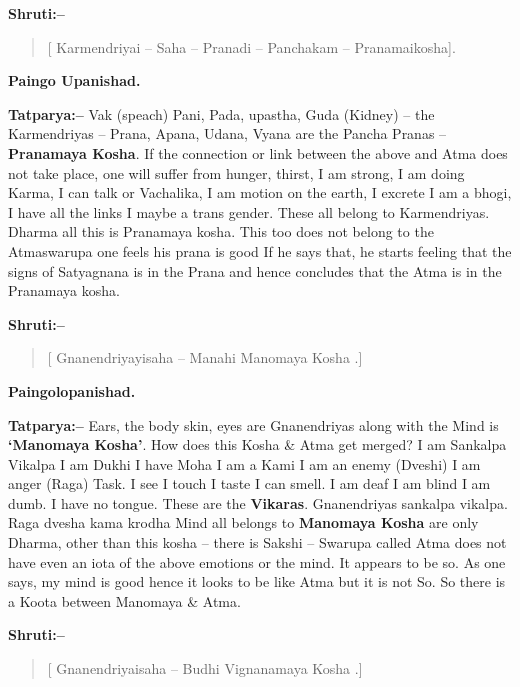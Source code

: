 \textbf{Shruti:–}

\begin{verse}
[ Karmendriyai – Saha – Pranadi – Panchakam – Pranamaikosha].
\end{verse}

\begin{flushright}
\textbf{Paingo Upanishad.}
\end{flushright}

\textbf{Tatparya:–} Vak (speach) Pani, Pada, upastha, Guda (Kidney) – the Karmendriyas – Prana, Apana, Udana, Vyana are the Pancha Pranas – \textbf{Pranamaya Kosha}. If the connection or link between the above and Atma does not take place, one will suffer from hunger, thirst, I am strong, I am doing Karma, I can talk or Vachalika, I am motion on the earth, I excrete I am a bhogi, I have all the links I maybe a trans gender. These all belong to Karmendriyas. Dharma all this is Pranamaya kosha. This too does not belong to the Atmaswarupa one feels his prana is good If he says that, he starts feeling that the signs of Satyagnana is in the Prana and hence concludes that the Atma is in the Pranamaya kosha.

\textbf{Shruti:–}

\begin{verse}
[ Gnanendriyayisaha – Manahi Manomaya Kosha .]
\end{verse}

\begin{flushright}
\textbf{Paingolopanishad.}
\end{flushright}

\textbf{Tatparya:–} Ears, the body skin, eyes are Gnanendriyas along with the Mind is \textbf{‘Manomaya Kosha’}. How does this Kosha \& Atma get merged? I am Sankalpa Vikalpa I am Dukhi I have Moha I am a Kami I am an enemy (Dveshi) I am anger (Raga) Task. I see I touch I taste I can smell. I am deaf I am blind I am dumb. I have no tongue. These are the \textbf{Vikaras}. Gnanendriyas sankalpa vikalpa. Raga dvesha kama krodha Mind all belongs to \textbf{Manomaya Kosha} are only Dharma, other than this kosha – there is Sakshi – Swarupa called Atma does not have even an iota of the above emotions or the mind. It appears to be so. As one says, my mind is good hence it looks to be like Atma but it is not So. So there is a Koota between Manomaya \& Atma.

\textbf{Shruti:–}

\begin{verse}
[ Gnanendriyaisaha – Budhi Vignanamaya Kosha .]
\end{verse}

